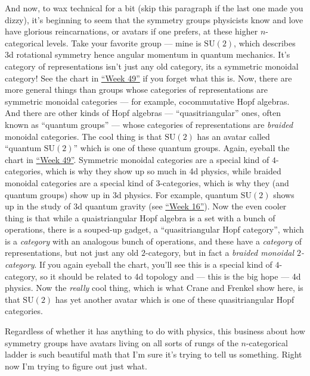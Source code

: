 \documentclass[12pt]{article}
\begin{document}
And now, to wax technical for a bit (skip this paragraph if the last one
made you dizzy), it's beginning to seem that the symmetry groups
physicists know and love have glorious reincarnations, or avatars if one
prefers, at these higher \(n\)-categorical levels. Take your favorite
group --- mine is \(\mathrm{SU}(2)\), which describes 3d rotational
symmetry hence angular momentum in quantum mechanics. It's category of
representations isn't just any old category, its a symmetric monoidal
category! See the chart in \protect\hyperlink{week49}{``Week 49''} if
you forget what this is. Now, there are more general things than groups
whose categories of representations are symmetric monoidal categories
--- for example, cocommutative Hopf algebras. And there are other kinds
of Hopf algebras --- ``quasitriangular'' ones, often known as ``quantum
groups'' --- whose categories of representations are \emph{braided}
monoidal categories. The cool thing is that \(\mathrm{SU}(2)\) has an
avatar called ``quantum \(\mathrm{SU}(2)\)'' which is one of these
quantum groups. Again, eyeball the chart in
\protect\hyperlink{week49}{``Week 49''}. Symmetric monoidal categories
are a special kind of \(4\)-categories, which is why they show up so
much in 4d physics, while braided monoidal categories are a special kind
of \(3\)-categories, which is why they (and quantum groups) show up in
3d physics. For example, quantum \(\mathrm{SU}(2)\) shows up in the
study of 3d quantum gravity (see \protect\hyperlink{week16}{``Week
16''}). Now the even cooler thing is that while a quaistriangular Hopf
algebra is a set with a bunch of operations, there is a souped-up
gadget, a ``quasitriangular Hopf category'', which is a \emph{category}
with an analogous bunch of operations, and these have a \emph{category}
of representations, but not just any old \(2\)-category, but in fact a
\emph{braided monoidal \(2\)-category}. If you again eyeball the chart,
you'll see this is a special kind of \(4\)-category, so it should be
related to 4d topology and --- this is the big hope --- 4d physics. Now
the \emph{really} cool thing, which is what Crane and Frenkel show here,
is that \(\mathrm{SU}(2)\) has yet another avatar which is one of these
quasitriangular Hopf categories.

Regardless of whether it has anything to do with physics, this business
about how symmetry groups have avatars living on all sorts of rungs of
the \(n\)-categorical ladder is such beautiful math that I'm sure it's
trying to tell us something. Right now I'm trying to figure out just
what.
\end{document}
